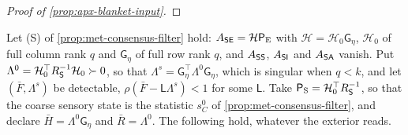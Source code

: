 \begin{proof}[Proof of \cref{prop:apx-blanket-input}]
\end{proof}

\begin{remark}\label{rem:apx-blanket-partial}
Let (S) of \cref{prop:met-consensus-filter} hold: $A_{\mathsf{S}\mathsf{E}}=\mathcal H\mathsf P_{\mathrm E}$ with $\mathcal H=\mathcal H_0\mathsf G_\eta$, $\mathcal H_0$ of full column rank $q$ and $\mathsf G_\eta$ of full row rank $q$, and $A_{\mathsf{S}\mathsf{S}}$, $A_{\mathsf{S}\mathsf{I}}$ and $A_{\mathsf{S}\mathsf{A}}$ vanish. Put $\Lambda^0=\mathcal H_0^\top R_{\mathsf{S}}^{-1}\mathcal H_0\succ0$, so that $\Lambda^s=\mathsf G_\eta^\top\Lambda^0\mathsf G_\eta$, which is singular when $q<k$, and let $(\bar F,\Lambda^s)$ be detectable, $\rho(\bar F-\mathsf L\Lambda^s)<1$ for some $\mathsf L$. Take $\mathsf P_{\mathrm S}=\mathcal H_0^\top R_{\mathsf{S}}^{-1}$, so that the coarse sensory state is the statistic $s^0_C$ of \cref{prop:met-consensus-filter}, and declare $\bar H=\Lambda^0\mathsf G_\eta$ and $\bar R=\Lambda^0$. The following hold, whatever the exterior reads.


\end{remark}
